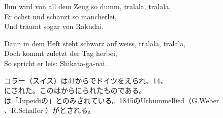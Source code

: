 \documentclass[10pt,b5j]{tarticle} %
\begin{document}
\begin{enumerate}
\begin{minipage}[c]{\blocksize}
        \vspace{\linespace}
        \item
        Ihm wird von all dem Zeug so dumm, tralala, tralala,\\
        Er ochst und schanzt so mancherlei,\\
        Und traumt sogar von Rakudai.
        
        \vspace{\linespace}
        \item
        Dann in dem Heft steht schwarz auf weiss, tralala, tralala,\\
        Doch kommt zuletzt der Tag herbei,\\
        So spricht er leis: Shikata-ga-nai.
        
        
        \vspace{\linespace}
        \item
        コラー（スイス）は41からでドイツをえられ、14、\\
        にされた。このはからにられたものである。\\
        は「Jupeidiの」とのみされている。1845のUrbummellied（G.Weber\\
        、R.Schaffer ）がとされる。
    
    \end{minipage}
\end{enumerate} %
\end{document}
